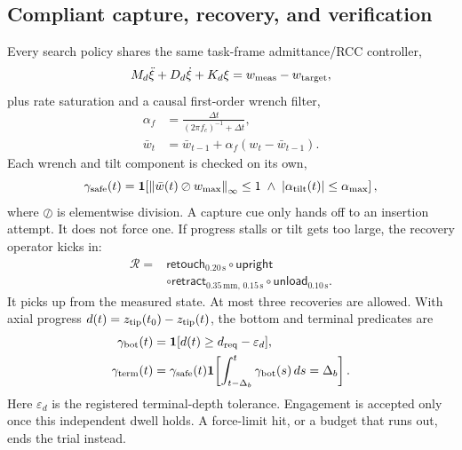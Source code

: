 \documentclass[letterpaper,10 pt,conference]{ieeeconf}
\newcommand{\ind}{\mathbf{1}}
\begin{document}
\subsection{Compliant capture, recovery, and verification}

Every search policy shares the same task-frame admittance/RCC controller,
\begin{equation}
M_d\ddot\xi+D_d\dot\xi+K_d\xi=w_{\rm meas}-w_{\rm target},
\label{eq:admittance}
\end{equation}
plus rate saturation and a causal first-order wrench filter,
\begin{align}
\alpha_f&=\frac{\Delta t}{(2\pi f_c)^{-1}+\Delta t},
\nonumber\\
\bar w_t&=\bar w_{t-1}+\alpha_f(w_t-\bar w_{t-1}).
\label{eq:wrench_filter}
\end{align}
Each wrench and tilt component is checked on its own,
\begin{equation}
\gamma_{\rm safe}(t)=
\ind\!\left[\left\|\bar w(t)\oslash w_{\max}\right\|_\infty\le1
\;\land\;|\alpha_{\rm tilt}(t)|\le\alpha_{\max}\right],
\label{eq:safety_guard}
\end{equation}
where $\oslash$ is elementwise division.  A capture cue only hands off to
an insertion attempt.  It does not force one.  If progress stalls or tilt
gets too large, the recovery operator kicks in:
\begin{equation}
\begin{aligned}
\mathcal R={}&\mathsf{retouch}_{0.20\,\mathrm{s}}\circ
\mathsf{upright}\\
&\circ\mathsf{retract}_{0.35\,\mathrm{mm},\,0.15\,\mathrm{s}}
\circ\mathsf{unload}_{0.10\,\mathrm{s}}.
\end{aligned}
\label{eq:recovery_map}
\end{equation}
It picks up from the measured state.  At most three recoveries are
allowed.  With axial progress $d(t)=z_{\rm tip}(t_0)-z_{\rm tip}(t)$, the
bottom and terminal predicates are
\begin{align}
\gamma_{\rm bot}(t)&=\ind[d(t)\ge d_{\rm req}-\varepsilon_d],
\nonumber\\
\gamma_{\rm term}(t)&=\gamma_{\rm safe}(t)
\ind\!\left[\int_{t-\Delta_b}^{t}\gamma_{\rm bot}(s)\,ds=\Delta_b\right].
\label{eq:terminal_dwell}
\end{align}
Here $\varepsilon_d$ is the registered terminal-depth tolerance.
Engagement is accepted only once this independent dwell holds.  A
force-limit hit, or a budget that runs out, ends the trial instead.
\end{document}
